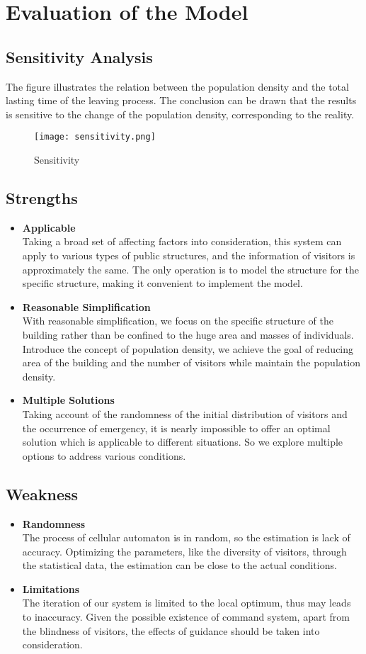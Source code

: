 \documentclass{mcmthesis}
\begin{document}
\section{Evaluation of the Model}
\subsection{Sensitivity Analysis}
The figure illustrates the relation between the population density and the total lasting time of the leaving process. The conclusion can be drawn that the results is sensitive to the change of the population density, corresponding to the reality.
\begin{figure}[htbp]
		\centering
		\caption{Sensitivity}
		\texttt{[image: sensitivity.png]}
\end{figure}
\subsection{Strengths}
\begin{itemize}
	\item \textbf{Applicable}\\
		Taking a broad set of affecting factors into consideration, this system can apply to various types of public structures, and the information of visitors is approximately the same. The only operation is to model the structure for the specific structure, making it convenient to implement the model.
	\item \textbf{Reasonable Simplification}\\
		With reasonable simplification, we focus on the specific structure of the building rather than be confined to the huge area and masses of
		individuals. Introduce the concept of population density, we achieve the goal of reducing area of the building and the number of visitors while maintain the population density.
	\item \textbf{Multiple Solutions}\\
		Taking account of the randomness of the initial distribution of visitors and the occurrence of emergency, it is nearly impossible to offer an optimal solution which is applicable to different situations. So we explore multiple options to address various conditions.
\end{itemize}
\subsection{Weakness}
\begin{itemize}
	\item \textbf{Randomness}\\
		The process of cellular automaton is in random, so the estimation is lack of accuracy. Optimizing the parameters, like the diversity of visitors, through the statistical data, the  estimation can be close to the actual conditions.
	\item \textbf{Limitations}\\
		The iteration of our system is limited to the local optimum, thus may leads to inaccuracy. Given the possible existence of command system, apart from the blindness of visitors, the effects of guidance should be taken into consideration.
\end{itemize}
\end{document}
